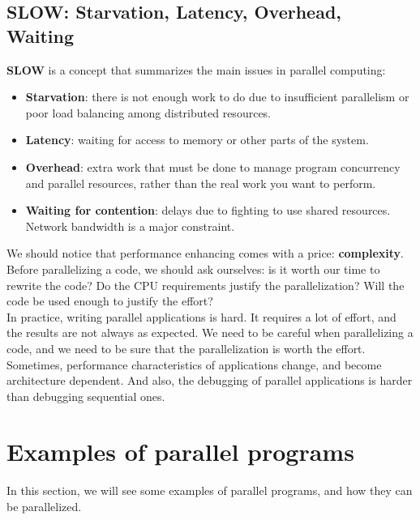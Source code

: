 \subsection{SLOW: Starvation, Latency, Overhead, Waiting}

\textbf{SLOW} is a concept that summarizes the main issues in parallel computing:

\begin{itemize}
    \item \textbf{Starvation}: there is not enough work to do due to insufficient 
    parallelism or poor load balancing among distributed resources.
    
    \item \textbf{Latency}: waiting for access to memory or other parts of the system.
    
    \item \textbf{Overhead}: extra work that must be done to manage program concurrency
    and parallel resources, rather than the real work you want to perform. 
    
    \item \textbf{Waiting for contention}: delays due to fighting to use shared resources.
    Network bandwidth is a major constraint.
\end{itemize}

We should notice that performance enhancing comes with a price: \textbf{complexity}.
Before parallelizing a code, we should ask ourselves: is it worth our time to 
rewrite the code? Do the CPU requirements justify the parallelization? Will the code
be used enough to justify the effort?\\

In practice, writing parallel applications is hard. It requires a lot of effort, and
the results are not always as expected. We need to be careful when parallelizing
a code, and we need to be sure that the parallelization is worth the effort.\\

Sometimes, performance characteristics of applications change, and become architecture
dependent. And also, the debugging of parallel applications is harder than debugging
sequential ones.\\


\section{Examples of parallel programs}

In this section, we will see some examples of parallel programs, and how they can be
parallelized.


